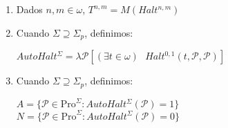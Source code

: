 \documentclass{article}
\begin{document}
\begin{enumerate}
\item Dados $n, m \in \omega$, $T^{n, m} = M(Halt^{n, m})$
\item Cuando $\Sigma \supseteq \Sigma_p$, definimos:
\begin{center}
    $AutoHalt^{\Sigma} = \lambda \mathcal{P}[(\exists t \in \omega) \text{ } Halt^{0,1}(t, \mathcal{P}, \mathcal{P})]$
\end{center}

\item Cuando $\Sigma \supseteq \Sigma_p$, definimos:
\begin{center}
    $A = \{\mathcal{P} \in \text{Pro}^{\Sigma} : AutoHalt^{\Sigma}(\mathcal{P}) = 1 \}$\\
    $N = \{\mathcal{P} \in \text{Pro}^{\Sigma} : AutoHalt^{\Sigma}(\mathcal{P}) = 0 \}$\\
\end{center}

\end{enumerate}
\end{document}
